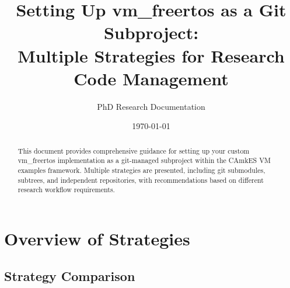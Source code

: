 \documentclass[11pt,a4paper]{article}
\title{Setting Up vm\_freertos as a Git Subproject: \\
Multiple Strategies for Research Code Management}
\author{PhD Research Documentation}
\date{\today}
\begin{document}
\maketitle

\begin{abstract}
This document provides comprehensive guidance for setting up your custom vm\_freertos implementation as a git-managed subproject within the CAmkES VM examples framework. Multiple strategies are presented, including git submodules, subtrees, and independent repositories, with recommendations based on different research workflow requirements.
\end{abstract}

\section{Overview of Strategies}

\subsection{Strategy Comparison}
\end{document}

